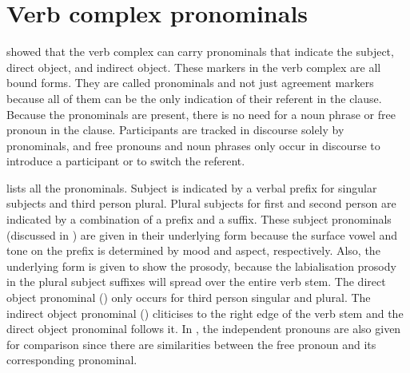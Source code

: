 \section{Verb complex pronominals}\label{sec:7.3}
\hypertarget{RefHeading1212141525720847}{}
\citet{FriesenMamalis2008} showed that the verb complex can carry pronominals that indicate the subject, direct object, and indirect object. These markers in the verb complex are all bound forms. They are called pronominals and not just agreement markers because all of them can be the only indication of their referent in the clause. Because the pronominals are present, there is no need for a noun phrase or free pronoun in the clause. Participants are tracked in discourse solely by pronominals, and free pronouns and noun phrases only occur in discourse to introduce a participant or to switch the referent. 


 lists all the pronominals.  Subject is indicated by a verbal prefix for singular subjects and third person plural.  Plural subjects for first and second person are indicated by a combination of a prefix and a suffix. These subject pronominals (discussed in ) are given in their underlying form because the surface vowel and tone on the prefix is determined by mood and aspect, respectively. Also, the underlying form is given to show the prosody, because the labialisation prosody in the plural subject suffixes will spread over the entire verb stem. The direct object pronominal () only occurs for third person singular and plural. The indirect object pronominal () cliticises to the right edge of the verb stem and the direct object pronominal follows it. In , the independent pronouns are also given for comparison since there are similarities between the free pronoun and its corresponding pronominal.

